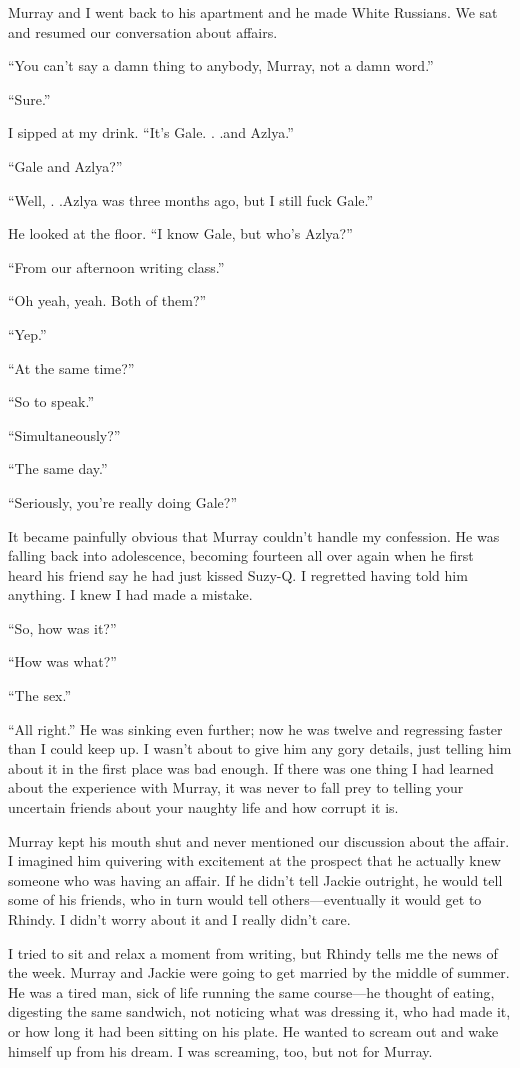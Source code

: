 Murray and I went back to his apartment and he made White Russians. We
sat and resumed our conversation about affairs.

``You can't say a damn thing to anybody, Murray, not a damn word.''

``Sure.''

I sipped at my drink. ``It's Gale. . .and Azlya.''

``Gale and Azlya?''

``Well, . .Azlya was three months ago, but I still fuck Gale.''

He looked at the floor. ``I know Gale, but who's Azlya?''

``From our afternoon writing class.''

``Oh yeah, yeah. Both of them?''

``Yep.''

``At the same time?''

``So to speak.''

``Simultaneously?''

``The same day.''

``Seriously, you're really doing Gale?''

It became painfully obvious that Murray couldn't handle my confession.
He was falling back into adolescence, becoming fourteen all over again
when he first heard his friend say he had just kissed Suzy-Q. I
regretted having told him anything. I knew I had made a mistake.

``So, how was it?''

``How was what?''

``The sex.''

``All right.'' He was sinking even further; now he was twelve and
regressing faster than I could keep up. I wasn't about to give him any
gory details, just telling him about it in the first place was bad
enough. If there was one thing I had learned about the experience with
Murray, it was never to fall prey to telling your uncertain friends
about your naughty life and how corrupt it is.

Murray kept his mouth shut and never mentioned our discussion about the
affair. I imagined him quivering with excitement at the prospect that he
actually knew someone who was having an affair. If he didn't tell Jackie
outright, he would tell some of his friends, who in turn would tell
others---eventually it would get to Rhindy. I didn't worry about it and
I really didn't care.

I tried to sit and relax a moment from writing, but Rhindy tells me the
news of the week. Murray and Jackie were going to get married by the
middle of summer. He was a tired man, sick of life running the same
course---he thought of eating, digesting the same sandwich, not noticing
what was dressing it, who had made it, or how long it had been sitting
on his plate. He wanted to scream out and wake himself up from his
dream. I was screaming, too, but not for Murray.

